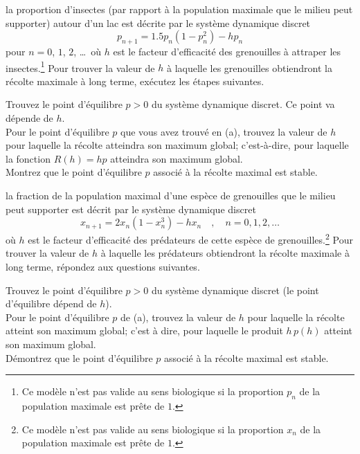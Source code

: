 \begin{question}
la proportion d'insectes (par rapport à la population maximale que le
milieu peut supporter) autour d'un lac est décrite par le système
dynamique discret
\[
p_{n+1} = 1.5 p_n (1-p_n^2) - h p_n
\]
pour $n=0$, $1$, $2$, \ldots\ où $h$ est le facteur d'efficacité
des grenouilles à attraper les insectes.\footnote{Ce
modèle n'est pas valide au sens biologique si la proportion $p_n$ de
la population maximale est prête de $1$.}  Pour trouver la valeur de
$h$ à laquelle les grenouilles obtiendront la récolte maximale à long
terme, exécutez les étapes suivantes.

 Trouvez le point d'équilibre $p>0$ du système dynamique
discret.  Ce point va dépende de $h$.\\
 Pour le point d'équilibre $p$ que vous avez trouvé en (a),
trouvez la valeur de $h$ pour laquelle la récolte atteindra son
maximum global; c'est-à-dire, pour laquelle la fonction
$R(h) = h p$ atteindra son maximum global.\\
 Montrez que le point d'équilibre $p$ associé à la récolte
maximal est stable. 
\label{6Q118}
\end{question}

\begin{question}
la fraction de la population maximal d'une espèce de grenouilles que
le milieu peut supporter est décrit par le système dynamique discret
\[
x_{n+1} = 2 x_n (1 - x_n^3) - h x_n \quad , \quad n=0, 1, 2, \ldots
\]
où $h$ est le facteur d'efficacité des prédateurs de cette espèce de
grenouilles.\footnote{Ce modèle n'est pas valide au sens biologique si
la proportion $x_n$ de la population maximale est prête de $1$.}  Pour
trouver la valeur de $h$ à laquelle les prédateurs obtiendront la
récolte maximale à long terme, répondez aux questions suivantes.

 Trouvez le point d'équilibre $p>0$ du système dynamique
discret (le point d'équilibre dépend de $h$).\\
 Pour le point d'équilibre $p$ de (a), trouvez la valeur de
$h$ pour laquelle la récolte atteint son maximum global; c'est à dire,
pour laquelle le produit $h \, p(h)$ atteint son maximum global.\\
 Démontrez que le point d'équilibre $p$ associé
à la récolte maximal est stable.
\label{6Q119}
\end{question}

